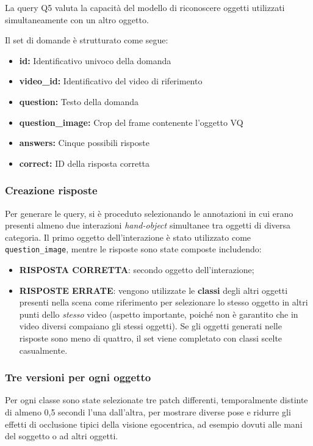 La query Q5 valuta la capacità del modello di riconoscere oggetti utilizzati simultaneamente con un altro oggetto.

Il set di domande è strutturato come segue:
\begin{itemize}
    \item \textbf{id:} Identificativo univoco della domanda
    \item \textbf{video\_id:} Identificativo del video di riferimento
    \item \textbf{question:} Testo della domanda
    \item \textbf{question\_image:} Crop del frame contenente l'oggetto VQ
    \item \textbf{answers:} Cinque possibili risposte
    \item \textbf{correct:} ID della risposta corretta
\end{itemize}

\subsubsection*{Creazione risposte}
Per generare le query, si è proceduto selezionando le annotazioni in cui erano presenti almeno due interazioni \emph{hand-object} simultanee tra oggetti di diversa categoria. Il primo oggetto dell'interazione è stato utilizzato come \texttt{question\_image}, mentre le risposte sono state composte includendo:

\begin{itemize}
    \item \textbf{RISPOSTA CORRETTA}: secondo oggetto dell'interazione;
    \item \textbf{RISPOSTE ERRATE}: vengono utilizzate le \textbf{classi} degli altri oggetti presenti nella scena come riferimento per selezionare lo stesso oggetto in altri punti dello \emph{stesso} video (aspetto importante, poiché non è garantito che in video diversi compaiano gli stessi oggetti). Se gli oggetti generati nelle risposte sono meno di quattro, il set viene completato con classi scelte casualmente.
\end{itemize}

\subsubsection*{Tre versioni per ogni oggetto}
Per ogni classe sono state selezionate tre patch differenti, temporalmente distinte di almeno 0,5 secondi l'una dall'altra, per mostrare diverse pose e ridurre gli effetti di occlusione tipici della visione egocentrica, ad esempio dovuti alle mani del soggetto o ad altri oggetti.

